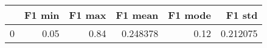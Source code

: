 \begin{tabular}{lrrrrr}
\toprule
{} &  F1 min &  F1 max &   F1 mean &  F1 mode &    F1 std \\
\midrule
0 &    0.05 &    0.84 &  0.248378 &     0.12 &  0.212075 \\
\bottomrule
\end{tabular}
